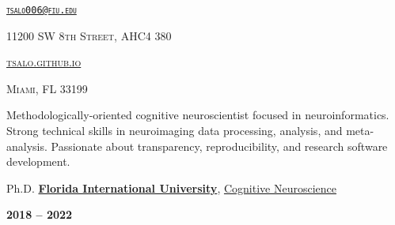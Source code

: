 \documentclass[10pt]{article}
\date{}
\newcommand{\namestyle}{\Huge \fontfamily{lmr}\selectfont}
\newcommand{\iconstyle}{\LARGE}
\newcommand{\headstyle}{\scshape \normalsize \textcolor{light-gray}}
\newcommand{\sectionstyle}{\LARGE \fontfamily{lmr}\selectfont}
\begin{document}
\begin{center}
	\namestyle{TAYLOR SALO}

	\bigskip

	\iconstyle{\href{https://github.com/tsalo}{\faGithubSquare}}
	\enspace
	\iconstyle{\href{https://orcid.org/0000-0001-9813-3167}{}}
	\enspace
	\iconstyle{\href{https://scholar.google.com/citations?user=YbH1akIAAAAJ}{}}
	\enspace
	\iconstyle{\href{https://osf.io/iwpvm/}{}}
\end{center}

\begin{minipage}[t]{.5\linewidth}
\flushleft
\headstyle{\href{mailto:tsalo006@fiu.edu}{\nolinkurl{tsalo006@fiu.edu}}}
\end{minipage}
\hfill
\begin{minipage}[t]{.5\linewidth}
\flushright
\headstyle{11200 SW 8th Street, AHC4 380}
\end{minipage}

\begin{minipage}[t]{.3\linewidth}
\flushleft
\headstyle{\href{https://tsalo.github.io}{tsalo.github.io}}
\end{minipage}
\hfill
\begin{minipage}[t]{.7\linewidth}
\flushright
\headstyle{Miami, FL 33199}
\end{minipage}


\bigskip

\begin{center}\sectionstyle{PROFILE}\end{center}

Methodologically-oriented cognitive neuroscientist focused in neuroinformatics.
Strong technical skills in neuroimaging data processing, analysis, and meta-analysis.
Passionate about transparency, reproducibility, and research software development.

\bigskip

\begin{center}\sectionstyle{EDUCATION}\end{center}

\begin{minipage}[t]{.7\linewidth}
	\flushleft
	\noindent
	Ph.D.
	\href{https://fiu.edu}{\textbf{Florida International University}},
	\href{https://case.fiu.edu/psychology/phd-in-cognitive-neuroscience/}{Cognitive Neuroscience}
	\end{minipage}
	\hfill
	\begin{minipage}[t]{.3\linewidth}
	\flushright
	\noindent
	\textsc{\textbf{2018 -- 2022}}
\end{minipage}
\end{document}
